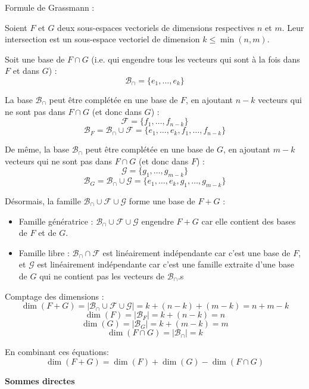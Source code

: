 \documentclass[10pt,a4paper]{article}
\begin{document}
\q Formule de Grassmann :

Soient $F$ et $G$ deux sous-espaces vectoriels de dimensions respectives $n$ et $m$. Leur
intersection est un sous-espace vectoriel de dimension $k \leq \min(n, m)$.

Soit une base de $F \cap G$ (i.e. qui engendre tous les vecteurs qui sont à la fois dans $F$ et dans
$G$) :
\[ \mathcal{B}_\cap = \{e_1, \ldots, e_k\} \]

La base $\mathcal{B}_\cap$ peut être complétée en une base de $F$, en ajoutant $n-k$ vecteurs qui ne
sont pas dans $F \cap G$ (et donc dans $G$) :
\[ \mathcal{F} = \{f_1, \ldots, f_{n-k}\} \]
\[ \mathcal{B}_F = \mathcal{B}_\cap \cup \mathcal{F} = \{e_1, \ldots, e_k, f_1, \ldots, f_{n-k}\} \]

De même, la base $\mathcal{B}_\cap$ peut être complétée en une base de $G$, en ajoutant $m-k$
vecteurs qui ne sont pas dans $F \cap G$ (et donc dans $F$) :
\[ \mathcal{G} = \{g_1, \ldots, g_{m-k}\} \]
\[ \mathcal{B}_G = \mathcal{B}_\cap \cup \mathcal{G} = \{e_1, \ldots, e_k, g_1, \ldots, g_{m-k}\} \]

Désormais, la famille $\mathcal{B}_\cap \cup \mathcal{F} \cup \mathcal{G}$ forme une base de $F + G$ :
\begin{itemize}
    \item Famille génératrice : $\mathcal{B}_\cap \cup \mathcal{F} \cup \mathcal{G}$ engendre $F +
    G$ car elle contient des bases de $F$ et de $G$.
    \item Famille libre : $\mathcal{B}_\cap \cap \mathcal{F}$ est linéairement indépendante car
    c'est une base de $F$, et $\mathcal{G}$ est linéairement indépendante car c'est une famille
    extraite d'une base de $G$ qui ne contient pas les vecteurs de $\mathcal{B}_\cap$.s
\end{itemize}

Comptage des dimensions :
\[ \dim(F + G) = |\mathcal{B}_\cap \cup \mathcal{F} \cup \mathcal{G}| = k + (n-k) + (m-k) = n + m - k \]
\[ \dim(F) = |\mathcal{B}_F| = k + (n-k) = n \]
\[ \dim(G) = |\mathcal{B}_G| = k + (m-k) = m \]
\[ \dim(F \cap G) = |\mathcal{B}_\cap| = k \]

En combinant ces équations:
\[ \dim(F + G) = \dim(F) + \dim(G) - \dim(F \cap G) \]

\bigskip
\textbf{Sommes directes}
\end{document}
